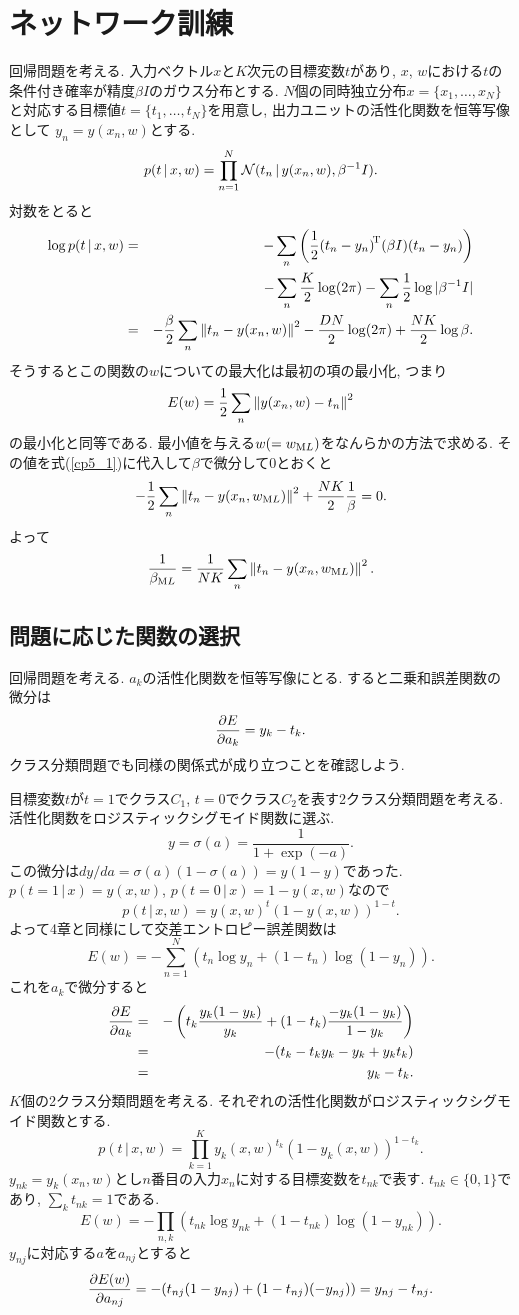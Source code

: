 \section{ネットワーク訓練}\label{ch5_net}
回帰問題を考える. 入力ベクトル$x$と$K$次元の目標変数$t$があり,
$x$, $w$における$t$の条件付き確率が精度$\beta I$のガウス分布とする.
$N$個の同時独立分布$x=\{x_1,\ldots,x_N\}$と対応する目標値$t=\{t_1,\ldots,t_N\}$を用意し, 出力ユニットの活性化関数を恒等写像として
$y_n=y(x_n,w)$とする.
$$
p(t\,|\,x,w)=\prod_{n=1}^N \calN(t_n\,|\,y(x_n,w),\beta^{-1}I).
$$
対数をとると
\begin{eqnarray}
\log p(t\,|\,x,w) &=& -\sum_n \left(\frac{1}{2}\trans{(t_n-y_n)}(\beta I)(t_n-y_n)\right)
\nonumber\\
&& - \sum_n \frac{K}{2}\log(2\pi) - \sum_n \frac{1}{2}\log|\beta^{-1}I| \nonumber \\
&=&-\frac{\beta}{2}\sum_n\Norm{t_n-y(x_n,w)}^2-\frac{DN}{2}\log(2\pi)+\frac{NK}{2}\log \beta.
\label{cp5_1}
\end{eqnarray}
そうするとこの関数の$w$についての最大化は最初の項の最小化, つまり
$$
E(w)=\frac{1}{2}\sum_n \Norm{y(x_n,w)-t_n}^2
$$
の最小化と同等である. 最小値を与える$w(=w_{\text ML})$をなんらかの方法で求める.
その値を式(\ref{cp5_1})に代入して$\beta$で微分して0とおくと
$$
-\frac{1}{2}\sum_n\Norm{t_n-y(x_n,w_{\text ML})}^2+\frac{NK}{2}\frac{1}{\beta}=0.
$$
よって
$$
\frac{1}{\beta_{\text ML}}=\frac{1}{NK}\sum_n\Norm{t_n-y(x_n,w_{\text ML})}^2.
$$
\vspace{0pt}

\subsection{問題に応じた関数の選択}
回帰問題を考える. $a_k$の活性化関数を恒等写像にとる.
すると二乗和誤差関数の微分は
$$
\diff{a_k}{E}=y_k-t_k.
$$
クラス分類問題でも同様の関係式が成り立つことを確認しよう.

目標変数$t$が$t=1$でクラス$C_1$, $t=0$でクラス$C_2$を表す2クラス分類問題を考える.
活性化関数をロジスティックシグモイド関数に選ぶ.
$$
y=\sigma(a)=\frac{1}{1+\exp(-a)}.
$$
この微分は$dy/da=\sigma(a)(1-\sigma(a))=y(1-y)$であった.
$p(t=1\,|\,x)=y(x,w)$, $p(t=0\,|\,x)=1-y(x,w)$なので
$$
p(t\,|\,x,w)=y(x,w)^t \left(1-y(x,w)\right)^{1-t}.
$$
よって4章と同様にして交差エントロピー誤差関数は
$$
E(w)=-\sum_{n=1}^N \left(t_n \log y_n + (1-t_n) \log (1-y_n)\right).
$$
これを$a_k$で微分すると
\begin{eqnarray*}
\diff{a_k}{E} &=& -\left(t_k\frac{y_k(1-y_k)}{y_k} + (1-t_k)\frac{-y_k(1-y_k)}{1-y_k}\right)\\
              &=& -(t_k - t_k y_k - y_k + y_k t_k)\\
              &=& y_k - t_k.
\end{eqnarray*}
$K$個の2クラス分類問題を考える. それぞれの活性化関数がロジスティックシグモイド関数とする.
$$
p(t\,|\,x,w)=\prod_{k=1}^K y_k(x,w)^{t_k} (1-y_k(x,w))^{1-t_k}.
$$
$y_{nk}=y_k(x_n,w)$とし$n$番目の入力$x_n$に対する目標変数を$t_{nk}$で表す.
$t_{nk}\in\{0,1\}$であり, $\sum_k t_{nk}=1$である.
$$
E(w)=-\prod_{n,k} (t_{nk} \log y_{nk}+(1-t_{nk})\log (1-y_{nk})).
$$
$y_{nj}$に対応する$a$を$a_{nj}$とすると
$$
\diff{a_{nj}}{E(w)}=-(t_{nj}(1-y_{nj})+(1-t_{nj})(-y_{nj}))=y_{nj}-t_{nj}.
$$

